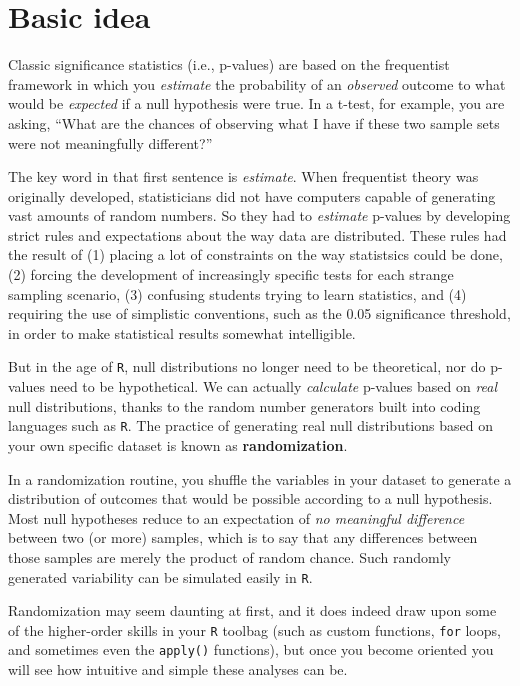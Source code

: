 \documentclass[
]{book}
\begin{document}
\hypertarget{basic-idea}{%
\section*{Basic idea}\label{basic-idea}}

Classic significance statistics (i.e., p-values) are based on the frequentist framework in which you \emph{estimate} the probability of an \emph{observed} outcome to what would be \emph{expected} if a null hypothesis were true. In a t-test, for example, you are asking, ``What are the chances of observing what I have if these two sample sets were not meaningfully different?''

The key word in that first sentence is \emph{estimate}. When frequentist theory was originally developed, statisticians did not have computers capable of generating vast amounts of random numbers. So they had to \emph{estimate} p-values by developing strict rules and expectations about the way data are distributed. These rules had the result of (1) placing a lot of constraints on the way statistsics could be done, (2) forcing the development of increasingly specific tests for each strange sampling scenario, (3) confusing students trying to learn statistics, and (4) requiring the use of simplistic conventions, such as the 0.05 significance threshold, in order to make statistical results somewhat intelligible.

But in the age of \texttt{R}, null distributions no longer need to be theoretical, nor do p-values need to be hypothetical. We can actually \emph{calculate} p-values based on \emph{real} null distributions, thanks to the random number generators built into coding languages such as \texttt{R}. The practice of generating real null distributions based on your own specific dataset is known as \textbf{randomization}.

In a randomization routine, you shuffle the variables in your dataset to generate a distribution of outcomes that would be possible according to a null hypothesis. Most null hypotheses reduce to an expectation of \emph{no meaningful difference} between two (or more) samples, which is to say that any differences between those samples are merely the product of random chance. Such randomly generated variability can be simulated easily in \texttt{R}.

Randomization may seem daunting at first, and it does indeed draw upon some of the higher-order skills in your \texttt{R} toolbag (such as custom functions, \texttt{for} loops, and sometimes even the \texttt{apply()} functions), but once you become oriented you will see how intuitive and simple these analyses can be.
\end{document}
